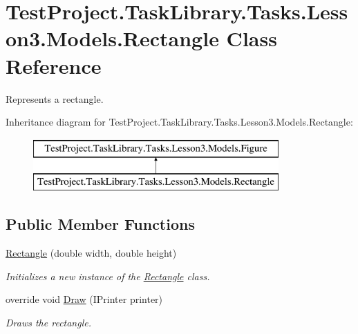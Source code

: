 \hypertarget{class_test_project_1_1_task_library_1_1_tasks_1_1_lesson3_1_1_models_1_1_rectangle}{}\section{Test\+Project.\+Task\+Library.\+Tasks.\+Lesson3.\+Models.\+Rectangle Class Reference}
\label{class_test_project_1_1_task_library_1_1_tasks_1_1_lesson3_1_1_models_1_1_rectangle}


Represents a rectangle.  


Inheritance diagram for Test\+Project.\+Task\+Library.\+Tasks.\+Lesson3.\+Models.\+Rectangle\+:\begin{figure}[H]
\begin{center}
\leavevmode
\includegraphics[height=2.000000cm]{class_test_project_1_1_task_library_1_1_tasks_1_1_lesson3_1_1_models_1_1_rectangle}
\end{center}
\end{figure}
\subsection*{Public Member Functions}
\begin{DoxyCompactItemize}
\item 
\mbox{\hyperlink{class_test_project_1_1_task_library_1_1_tasks_1_1_lesson3_1_1_models_1_1_rectangle_a9be55aba1ef3264c6dfe6c796d576c35}{Rectangle}} (double width, double height)
\begin{DoxyCompactList}\small\item\em Initializes a new instance of the \mbox{\hyperlink{class_test_project_1_1_task_library_1_1_tasks_1_1_lesson3_1_1_models_1_1_rectangle}{Rectangle}} class. \end{DoxyCompactList}\item 
override void \mbox{\hyperlink{class_test_project_1_1_task_library_1_1_tasks_1_1_lesson3_1_1_models_1_1_rectangle_aba1c4aa1b28737fedd2bd3456bd6100e}{Draw}} (I\+Printer printer)
\begin{DoxyCompactList}\small\item\em Draws the rectangle. \end{DoxyCompactList}\end{DoxyCompactItemize}
